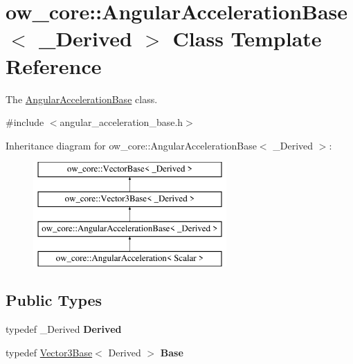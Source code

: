 \hypertarget{classow__core_1_1AngularAccelerationBase}{}\section{ow\+\_\+core\+:\+:Angular\+Acceleration\+Base$<$ \+\_\+\+Derived $>$ Class Template Reference}
\label{classow__core_1_1AngularAccelerationBase}


The \hyperlink{classow__core_1_1AngularAccelerationBase}{Angular\+Acceleration\+Base} class.  




{\ttfamily \#include $<$angular\+\_\+acceleration\+\_\+base.\+h$>$}

Inheritance diagram for ow\+\_\+core\+:\+:Angular\+Acceleration\+Base$<$ \+\_\+\+Derived $>$\+:\begin{figure}[H]
\begin{center}
\leavevmode
\includegraphics[height=4.000000cm]{d8/dfb/classow__core_1_1AngularAccelerationBase}
\end{center}
\end{figure}
\subsection*{Public Types}
\begin{DoxyCompactItemize}
\item 
typedef \+\_\+\+Derived {\bfseries Derived}\hypertarget{classow__core_1_1AngularAccelerationBase_ac1903b3d67c689f6ac2ce044371d65ab}{}\label{classow__core_1_1AngularAccelerationBase_ac1903b3d67c689f6ac2ce044371d65ab}

\item 
typedef \hyperlink{classow__core_1_1Vector3Base}{Vector3\+Base}$<$ Derived $>$ {\bfseries Base}\hypertarget{classow__core_1_1AngularAccelerationBase_a2fa563bb42ab1498cf4cbb164dffc5ef}{}\label{classow__core_1_1AngularAccelerationBase_a2fa563bb42ab1498cf4cbb164dffc5ef}

\end{DoxyCompactItemize}

